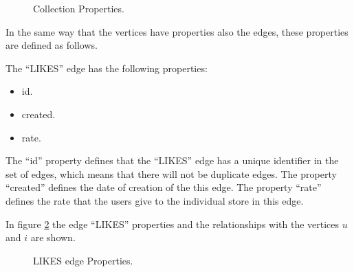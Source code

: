 \begin{figure}
\captionsetup{justification=centering,margin=2cm}
\centering
\setlength\fboxsep{0pt}
\setlength\fboxrule{0.7pt}
\caption{Collection Properties.}
\label{fig:Collection_node}
\end{figure}

In the same way that the vertices have properties also the edges, these
properties are defined as follows.

The “LIKES” edge has the following properties:

\begin{itemize}
\item id.
\item created.
\item rate.
\end{itemize}

The “id” property defines that the “LIKES” edge  has a unique identifier in the
set of edges, which means that there will not be duplicate edges. The property
“created” defines the date of creation of the this edge. The property “rate”
defines the rate that the users give to the individual store in this edge.

In figure \ref{fig:Likes_edge} the edge “LIKES” properties and the relationships with the vertices $u$ and $i$ are shown.


\begin{figure}
\captionsetup{justification=centering,margin=2cm}
\centering
\setlength\fboxsep{0pt}
\setlength\fboxrule{0.7pt}
\caption{LIKES edge Properties.}
\label{fig:Likes_edge}
\end{figure}

